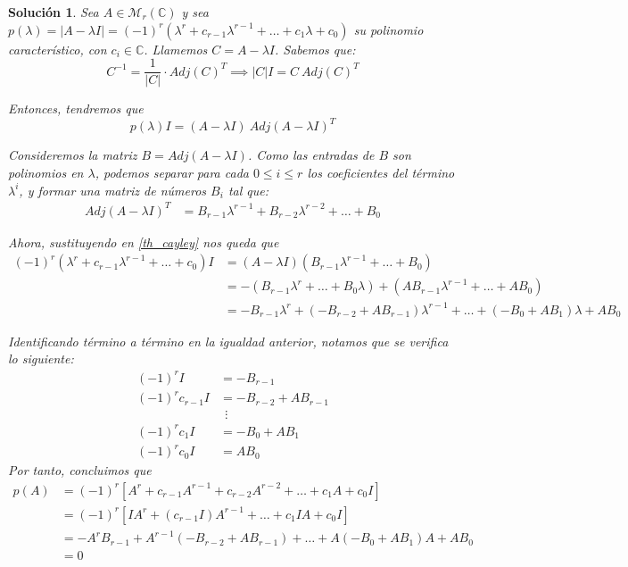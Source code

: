 \documentclass[11pt, a4paper]{article}
\newif\IfInSansMode
\numberwithin{equation}{section}
\theoremstyle{theorem-style}
\theoremstyle{definition-style}
\theoremstyle{remark-style}
\newtheorem*{sol}{Solución}
\theoremstyle{example-style}
\begin{document}
    \begin{sol}
        Sea $A \in \mathcal M_{r}(\mathbb C)$ y sea $p(\lambda) = |A - \lambda I| = (-1)^r(\lambda^r + c_{r-1}\lambda^{r-1} + \hdots + c_1\lambda + c_0)$ su polinomio característico, con $c_i \in \mathbb{C}$. Llamemos $C = A - \lambda I$. Sabemos que: $$C^{-1} = \frac{1}{|C|} \cdot Adj(C)^T \implies |C|I = C \ Adj(C)^T$$

Entonces, tendremos que 
\begin{equation} \label {th_cayley}
	p(\lambda)I = (A - \lambda I) \ Adj(A-\lambda I)^T
\end{equation} 

Consideremos la matriz $B = Adj(A - \lambda I)$. Como las entradas de $B$ son polinomios en $\lambda$, podemos separar para cada $0 \le i \le r$ los coeficientes del término $\lambda^i$, y formar una matriz de números $B_i$ tal que:
        \begin{align*}
            Adj(A - \lambda I)^T &= B_{r-1}\lambda^{r-1} + B_{r-2}\lambda^{r-2} + \hdots + B_0
        \end{align*}
        
        Ahora, sustituyendo en \eqref{th_cayley} nos queda que
        \begin{align*}
            (-1)^r(\lambda^r + c_{r-1}\lambda^{r-1} + \hdots + c_0)I &= (A -\lambda I)(B_{r-1}\lambda^{r-1} + \hdots + B_0) \\
                                                                     &= -(B_{r-1}\lambda^r + \hdots + B_0\lambda) + (AB_{r-1}\lambda^{r-1}+\hdots + AB_0) \\
                                                                     &= -B_{r-1}\lambda^r + (-B_{r-2}+AB_{r-1})\lambda^{r-1} + \hdots + (-B_0 + AB_1)\lambda + AB_0
        \end{align*}
        
        Identificando término a término en la igualdad anterior, notamos que se verifica lo siguiente:
        \begin{align*}
            \label{}
            (-1)^rI &= -B_{r-1} \\
            (-1)^rc_{r-1}I &= -B_{r-2}+AB_{r-1} \\
                           &\ \ \vdots \\
             (-1)^rc_1I &= -B_0 + AB_1 \\
            (-1)^rc_0I &= AB_0
        \end{align*}
Por tanto, concluimos que
        \begin{align*}
            \label{}
            p(A) &= (-1)^r \left[ A^r + c_{r-1}A^{r-1} + c_{r-2}A^{r-2} + \hdots + c_1A + c_0I \right] \\
                 &= (-1)^r \left[ IA^r + (c_{r-1}I)A^{r-1} + \hdots + c_1IA + c_0I \right] \\
                 &= -A^{r}B_{r-1}+A^{r-1}(-B_{r-2}+AB_{r-1}) + \hdots + A(-B_0 + AB_1)A + AB_0 \\ 
                 &= 0
        \end{align*}
    \end{sol}
\end{document}
